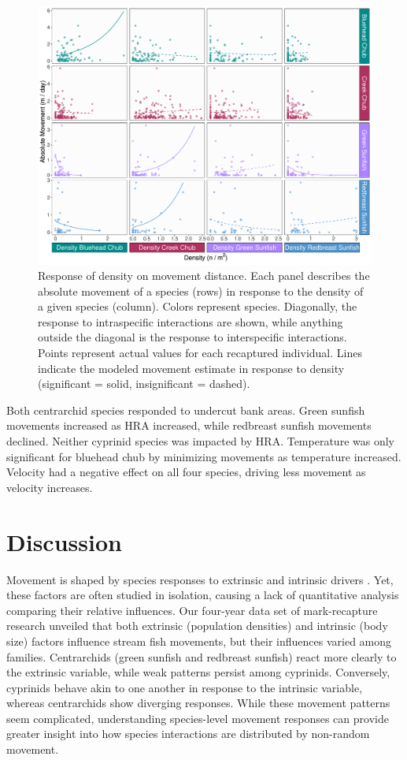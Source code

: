 \documentclass[11pt, class=article, crop=false]{standalone}
\begin{document}
\begin{figure}
    \centering
    \includegraphics[width=0.75\linewidth]{output/fig_density.pdf}
    \caption{Response of density on movement distance. Each panel describes the absolute movement of a species (rows) in response to the density of a given species (column). Colors represent species. Diagonally, the response to intraspecific interactions are shown, while anything outside the diagonal is the response to interspecific interactions. Points represent actual values for each recaptured individual. Lines indicate the modeled movement estimate in response to density (significant = solid, insignificant = dashed).}
    \label{fig:fig_density}
\end{figure}
Both centrarchid species responded to undercut bank areas. Green sunfish movements increased as HRA increased, while redbreast sunfish movements declined. Neither cyprinid species was impacted by HRA. Temperature was only significant for bluehead chub by minimizing movements as temperature increased. Velocity had a negative effect on all four species, driving less movement as velocity increases. 

\section{Discussion}

Movement is shaped by species responses to extrinsic and intrinsic drivers \citep{clobertDispersalEcologyEvolution2012}. Yet, these factors are often studied in isolation, causing a lack of quantitative analysis comparing their relative influences. Our four-year data set of mark-recapture research unveiled that both extrinsic (population densities) and intrinsic (body size) factors influence stream fish movements, but their influences varied among families. Centrarchids (green sunfish and redbreast sunfish) react more clearly to the extrinsic variable, while weak patterns persist among cyprinids. Conversely, cyprinids behave akin to one another in response to the intrinsic variable, whereas centrarchids show diverging responses. While these movement patterns seem complicated, understanding species-level movement responses can provide greater insight into how species interactions are distributed by non-random movement. 
\end{document}
